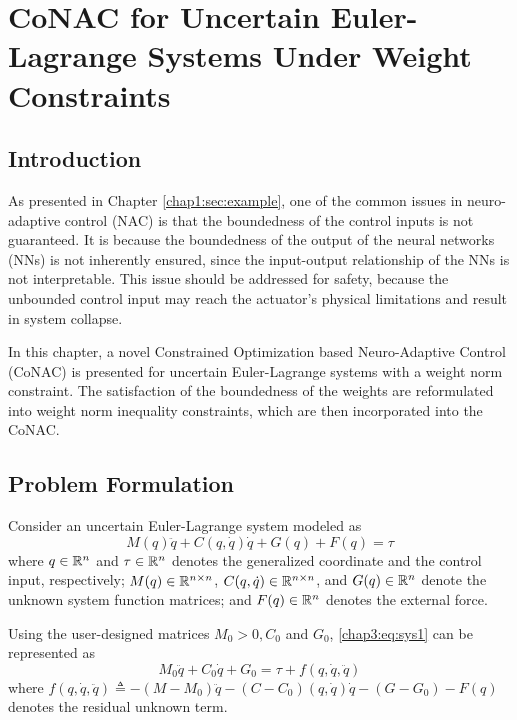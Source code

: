 
\chapter{
    CoNAC for Uncertain Euler-Lagrange Systems Under Weight Constraints
} \label{chapter3}

\section{Introduction} 

As presented in Chapter \ref{chap1:sec:example}, one of the common issues in neuro-adaptive control (NAC) is that the boundedness of the control inputs is not guaranteed.
It is because the boundedness of the output of the neural networks (NNs) is not inherently ensured, since the input-output relationship of the NNs is not interpretable.
This issue should be addressed for safety, because the unbounded control input may reach the actuator's physical limitations and result in system collapse.

In this chapter, a novel Constrained Optimization based Neuro-Adaptive Control (CoNAC) is presented for uncertain Euler-Lagrange systems with a weight norm constraint.
The satisfaction of the boundedness of the weights are reformulated into weight norm inequality constraints, which are then incorporated into the CoNAC.

\section{Problem Formulation}

Consider an uncertain Euler-Lagrange system modeled as
\begin{equation}
    M(q)\ddot q + C(q,\dot q)\dot q + G(q) + F(q) = \tau
    \label{chap3:eq:sys1}
\end{equation}
where $q\in \mathbb{R}^n$ and $\tau\in\mathbb{R}^n$ denotes the generalized coordinate and the control input, respectively; $M(q)\in\mathbb{R}^{n\times n}$, $C(q,\dot q)\in\mathbb{R}^{n\times n}$, and $G(q)\in\mathbb{R}^{n}$ denote the unknown system function matrices; and $F(q)\in\mathbb{R}^{n}$ denotes the external force.

Using the user-designed matrices $M_0>0,C_0$ and $G_0$, \eqref{chap3:eq:sys1} can be represented as 
\begin{equation}
    M_0\ddot q+C_0\dot q+G_0 = \tau + f(q,\dot q,\ddot q)
    \label{chap3:eq:sys2}
\end{equation}
where $f(q,\dot q,\ddot q) \triangleq -(M-M_0)\ddot q-(C-C_0)(q,\dot q)\dot q -(G-G_0) -F(q)$ denotes the residual unknown term.

